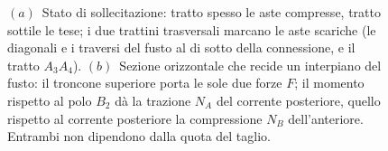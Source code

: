 \begin{figure}[htbp]
{
			}
			\caption{$(a)$~Stato di sollecitazione: tratto
				spesso le aste compresse, tratto sottile le tese;
				i due trattini trasversali marcano le aste
				scariche (le diagonali e i traversi del fusto al
				di sotto della connessione, e il tratto $A_3A_4$).
				$(b)$~Sezione orizzontale che recide un interpiano
				del fusto: il troncone superiore porta le sole due
				forze $F$; il momento rispetto al polo $B_2$ dà la
				trazione $N_A$ del corrente posteriore, quello
				rispetto al corrente posteriore la compressione
				$N_B$ dell'anteriore. Entrambi non dipendono dalla
				quota del taglio.}
			\label{fig:gru_soluzione}
		\end{figure}
